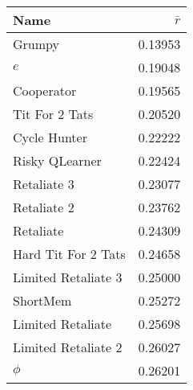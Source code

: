 \begin{tabular}{lr}
\toprule
Name                &                        $\bar{r}$\\
\midrule
Grumpy              &                         0.13953 \\
$e$                 &                         0.19048 \\
Cooperator          &                         0.19565 \\
Tit For 2 Tats      &                         0.20520 \\
Cycle Hunter        &                         0.22222 \\
Risky QLearner      &                         0.22424 \\
Retaliate 3         &                         0.23077 \\
Retaliate 2         &                         0.23762 \\
Retaliate           &                         0.24309 \\
Hard Tit For 2 Tats &                         0.24658 \\
Limited Retaliate 3 &                         0.25000 \\
ShortMem            &                         0.25272 \\
Limited Retaliate   &                         0.25698 \\
Limited Retaliate 2 &                         0.26027 \\
$\phi $              &                         0.26201 \\
\bottomrule
\end{tabular}
